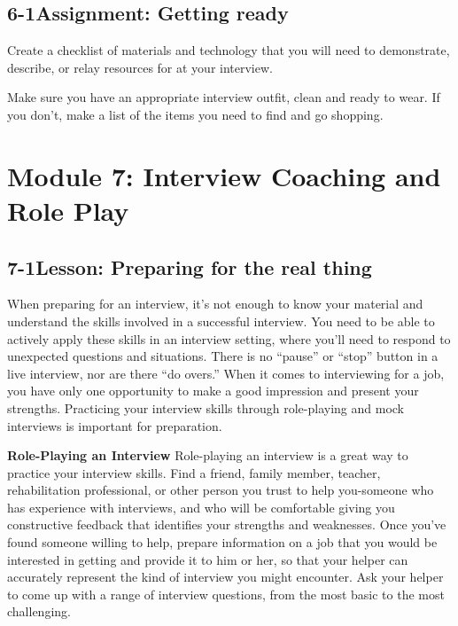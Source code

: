 \pagebreak \subsection*{6-1\quad Assignment: Getting ready}
Create a checklist of materials and technology that you will need to demonstrate, describe, or relay resources for at your interview.

Make sure you have an appropriate interview outfit, clean and ready to wear. If you don't, make a list of the items you need to find and go shopping.
  
\pagebreak \section*{Module 7:	Interview  Coaching and Role Play}
\noindent\makebox[\textwidth]{\rule{\linewidth}{0.4pt}}  \localtableofcontents 
\noindent\makebox[\textwidth]{\rule{\linewidth}{0.4pt}} 


\pagebreak \subsection*{7-1\quad Lesson: Preparing for the real thing}
When preparing for an interview, it's not enough to know your material and understand the skills involved in a successful interview. You need to be able to actively apply these skills in an interview setting, where you'll need to respond to unexpected questions and situations. There is no ``pause'' or ``stop'' button in a live interview, nor are there ``do overs.'' When it comes to interviewing for a job, you have only one opportunity to make a good impression and present your strengths. Practicing your interview skills through role-playing and mock interviews is important for preparation.

\textbf{Role-Playing an Interview}
\break Role-playing an interview is a great way to practice your interview skills. Find a friend, family member, teacher, rehabilitation professional, or other person you trust to help you-someone who has experience with interviews, and who will be comfortable giving you constructive feedback that identifies your strengths and weaknesses. Once you've found someone willing to help, prepare information on a job that you would be interested in getting and provide it to him or her, so that your helper can accurately represent the kind of interview you might encounter. Ask your helper to come up with a range of interview questions, from the most basic to the most challenging.

